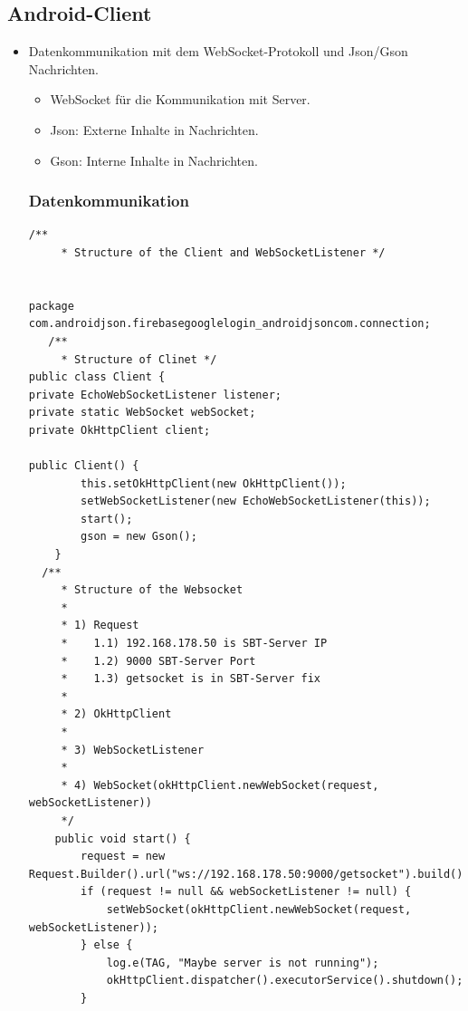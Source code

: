 \subsection{Android-Client}
\label{sec:client}
\begin{itemize}
\item Datenkommunikation mit dem WebSocket-Protokoll und Json/Gson Nachrichten.\\
\begin{itemize}
\item WebSocket für die Kommunikation mit Server.\\
\href{https://medium.com/@ssaurel/learn-to-use-websockets-on-android-with-okhttp-ba5f00aea988}{\color{blue}{Beispiel: Websocket on Android}}
\item Json: Externe Inhalte in Nachrichten.\\
\href{https://www.tutorialspoint.com/android/android_json_parser.htm}{\color{blue}{Beispiel: Json on Android}}
\item Gson: Interne Inhalte in Nachrichten.\\
\href{https://guides.codepath.com/android/leveraging-the-gson-library}{\color{blue}{Beispiel: Gson on Android}} 
\end{itemize}

\subsubsection{Datenkommunikation}

\begin{lstlisting}[frame=single]
/**
     * Structure of the Client and WebSocketListener */
     

package com.androidjson.firebasegooglelogin_androidjsoncom.connection;
   /**
     * Structure of Clinet */
public class Client {
private EchoWebSocketListener listener;
private static WebSocket webSocket;
private OkHttpClient client;

public Client() {
        this.setOkHttpClient(new OkHttpClient());
        setWebSocketListener(new EchoWebSocketListener(this));
        start();
        gson = new Gson();
    }
  /**
     * Structure of the Websocket
     *
     * 1) Request 
     *    1.1) 192.168.178.50 is SBT-Server IP
     *    1.2) 9000 SBT-Server Port
     *    1.3) getsocket is in SBT-Server fix
     *    
     * 2) OkHttpClient
     * 
     * 3) WebSocketListener
     * 
     * 4) WebSocket(okHttpClient.newWebSocket(request, webSocketListener))
     */
    public void start() {
        request = new Request.Builder().url("ws://192.168.178.50:9000/getsocket").build();
        if (request != null && webSocketListener != null) {
            setWebSocket(okHttpClient.newWebSocket(request, webSocketListener));
        } else {
            log.e(TAG, "Maybe server is not running");
            okHttpClient.dispatcher().executorService().shutdown();
        }


\end{lstlisting}
\end{itemize}
